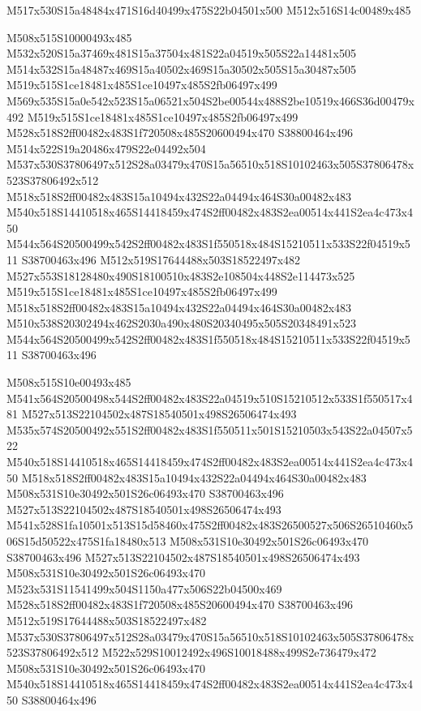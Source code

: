 \documentclass{article}
\begin{document}
\begin{multicols}{2}
\begin{center}
M517x530S15a48484x471S16d40499x475S22b04501x500 M512x516S14c00489x485 
\end{center}


M508x515S10000493x485 M532x520S15a37469x481S15a37504x481S22a04519x505S22a14481x505 M514x532S15a48487x469S15a40502x469S15a30502x505S15a30487x505 M519x515S1ce18481x485S1ce10497x485S2fb06497x499 M569x535S15a0e542x523S15a06521x504S2be00544x488S2be10519x466S36d00479x492 M519x515S1ce18481x485S1ce10497x485S2fb06497x499 M528x518S2ff00482x483S1f720508x485S20600494x470 S38800464x496 M514x522S19a20486x479S22e04492x504 M537x530S37806497x512S28a03479x470S15a56510x518S10102463x505S37806478x523S37806492x512 M518x518S2ff00482x483S15a10494x432S22a04494x464S30a00482x483 M540x518S14410518x465S14418459x474S2ff00482x483S2ea00514x441S2ea4c473x450 M544x564S20500499x542S2ff00482x483S1f550518x484S15210511x533S22f04519x511 S38700463x496 M512x519S17644488x503S18522497x482 M527x553S18128480x490S18100510x483S2e108504x448S2e114473x525 M519x515S1ce18481x485S1ce10497x485S2fb06497x499 M518x518S2ff00482x483S15a10494x432S22a04494x464S30a00482x483 M510x538S20302494x462S2030a490x480S20340495x505S20348491x523 M544x564S20500499x542S2ff00482x483S1f550518x484S15210511x533S22f04519x511 S38700463x496

M508x515S10e00493x485 M541x564S20500498x544S2ff00482x483S22a04519x510S15210512x533S1f550517x481 M527x513S22104502x487S18540501x498S26506474x493 M535x574S20500492x551S2ff00482x483S1f550511x501S15210503x543S22a04507x522 M540x518S14410518x465S14418459x474S2ff00482x483S2ea00514x441S2ea4c473x450 M518x518S2ff00482x483S15a10494x432S22a04494x464S30a00482x483 M508x531S10e30492x501S26c06493x470 S38700463x496 M527x513S22104502x487S18540501x498S26506474x493 M541x528S1fa10501x513S15d58460x475S2ff00482x483S26500527x506S26510460x506S15d50522x475S1fa18480x513 M508x531S10e30492x501S26c06493x470 S38700463x496 M527x513S22104502x487S18540501x498S26506474x493 M508x531S10e30492x501S26c06493x470 M523x531S11541499x504S1150a477x506S22b04500x469 M528x518S2ff00482x483S1f720508x485S20600494x470 S38700463x496 M512x519S17644488x503S18522497x482 M537x530S37806497x512S28a03479x470S15a56510x518S10102463x505S37806478x523S37806492x512 M522x529S10012492x496S10018488x499S2e736479x472 M508x531S10e30492x501S26c06493x470 M540x518S14410518x465S14418459x474S2ff00482x483S2ea00514x441S2ea4c473x450 S38800464x496


\end{multicols}
\end{document}
